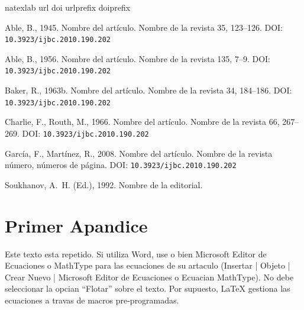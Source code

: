 \documentclass[5p,times,authoryear]{elsarticle}
\begin{document}





\begin{thebibliography}{7}
\expandafter\ifx\csname natexlab\endcsname\relax\def\natexlab#1{#1}\fi
\expandafter\ifx\csname url\endcsname\relax
  \def\url#1{\texttt{#1}}\fi
\expandafter\ifx\csname doi\endcsname\relax
  \def\doi#1{\texttt{#1}}\fi
\expandafter\ifx\csname urlprefix\endcsname\relax\def\urlprefix{URL: }\fi
\expandafter\ifx\csname doiprefix\endcsname\relax\def\doiprefix{DOI: }\fi

Able, B., 1945. Nombre del artículo. Nombre de la revista 35, 123--126.
\newline\doiprefix\doi{10.3923/ijbc.2010.190.202}

Able, B., 1956. Nombre del artículo. Nombre de la revista 135, 7--9.
\newline\doiprefix\doi{10.3923/ijbc.2010.190.202}

\bibitem[{Baker(1963{\natexlab{b}})}]{Bak:63b}
Baker, R., 1963{\natexlab{b}}. Nombre del artículo. Nombre de la revista 34,
  184--186.
\newline\doiprefix\doi{10.3923/ijbc.2010.190.202}

Charlie, F., Routh, M., 1966. Nombre del artículo. Nombre de la revista 66,
  267--269.
\newline\doiprefix\doi{10.3923/ijbc.2010.190.202}

García, F., Martínez, R., 2008. Nombre del artículo. Nombre de la revista
  número, {}números de página.
\newline\doiprefix\doi{10.3923/ijbc.2010.190.202}

Soukhanov, A.~H. (Ed.), 1992. Nombre de la editorial.


 \end{thebibliography}

\appendix
\section{Primer Apandice}    %
Este texto esta repetido. Si utiliza Word, use o bien Microsoft Editor de Ecuaciones o
MathType  para las ecuaciones de su artaculo (Insertar | Objeto |
Crear Nuevo | Microsoft Editor de Ecuaciones o Ecuacian MathType).
No debe seleccionar la opcian ``Flotar'' sobre el texto. Por
supuesto, LaTeX gestiona las ecuaciones a travas de macros
pre-programadas.
\end{document}

